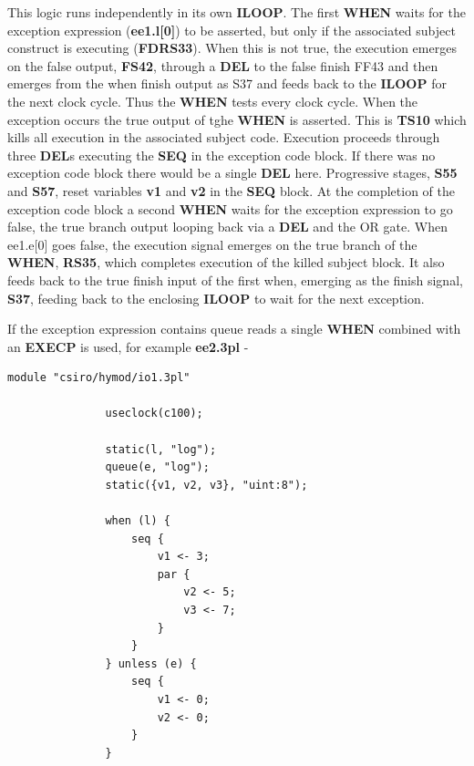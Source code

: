             This logic runs independently in its own {\bf ILOOP}. The first {\bf
            WHEN} waits for the exception expression ({\bf ee1.l[0]}) to be
            asserted, but only if the associated subject construct is executing
            ({\bf FDRS33}). When this is not true, the execution emerges on the
            false output, {\bf FS42}, through a {\bf DEL} to the false finish FF43
            and then emerges from the when finish output as S37 and feeds back to
            the {\bf ILOOP} for the next clock cycle. Thus the {\bf WHEN} tests every
            clock cycle. When the exception occurs the true output of tghe {\bf
            WHEN} is asserted. This is {\bf TS10} which kills all execution in the
            associated subject code. Execution proceeds through three {\bf DEL}s
            executing the {\bf SEQ} in the exception code block. If there was no
            exception code block there would be a single {\bf DEL} here.
            Progressive stages, {\bf S55} and {\bf S57}, reset variables {\bf v1}
            and {\bf v2} in the {\bf SEQ} block. At the completion of the exception
            code block a second {\bf WHEN} waits for the exception expression to go
            false, the true branch output looping back via a {\bf DEL} and the OR
            gate. When ee1.e[0] goes false, the execution signal emerges on the
            true branch of the {\bf WHEN}, {\bf RS35}, which completes execution of
            the killed subject block. It also feeds back to the true finish input
            of the first when, emerging as the finish signal, {\bf S37}, feeding
            back to the enclosing {\bf ILOOP} to wait for the next exception.

            If the exception expression contains queue reads a single {\bf WHEN}
            combined with an {\bf EXECP} is used, for example {\bf ee2.3pl} -

            \begin{lstlisting}[gobble=12, language=threepl]
               module "csiro/hymod/io1.3pl"

               useclock(c100);

               static(l, "log");
               queue(e, "log");
               static({v1, v2, v3}, "uint:8");

               when (l) {
                   seq {
                       v1 <- 3;
                       par {
                           v2 <- 5;
                           v3 <- 7;
                       }
                   }
               } unless (e) {
                   seq {
                       v1 <- 0;
                       v2 <- 0;
                   }
               }
            \end{lstlisting}
            
